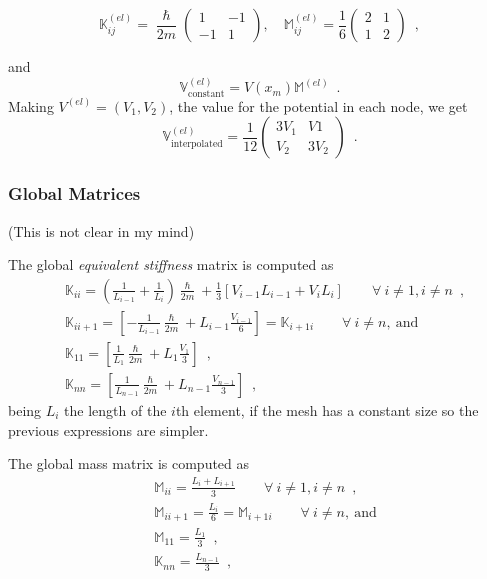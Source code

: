 \documentclass[12pt,letterpaper,final]{article}
\begin{document}
\[\mathbb{K}_{ij}^{(el)} = \frac{\hslash}{2m}  \begin{pmatrix}
  1 & -1  \\
  -1 & 1 
 \end{pmatrix}, \quad \mathbb{M}_{ij}^{(el)} = \frac{1}{6}  \begin{pmatrix}
  2 & 1 \\
  1 & 2 \end{pmatrix} \enspace ,\]
 
and 
 \[\mathbb{V}_{\text{constant}}^{(el)} = V(x_m)\mathbb{M}^{(el)} \enspace .\]
Making ${V}^{(el)} = (V_1,V_2)$, the value for the potential in each node, we get
\[\mathbb{V}_{\text{interpolated}}^{(el)} = \frac{1}{12}  \begin{pmatrix}
  3V_1 & V1 \\
  V_2 & 3V_2 
 \end{pmatrix} \enspace .\]

\subsubsection{Global Matrices}

(This is not clear in my mind)

The global \emph{equivalent stiffness} matrix is computed as
\begin{align*}
&\mathbb{K}_{ii}=\left(\frac{1}{L_{i-1}} + \frac{1}{L_{i}}\right)\frac{\hslash}{2m} + \frac{1}{3}[V_{i-1} L_{i-1} + V_{i}L_{i}] \qquad \forall\ i\neq 1, i\neq n \enspace, \\
&\mathbb{K}_{i i+1}=\left[ -\frac{1}{L_{i-1}}\frac{\hslash}{2m} + L_{i-1}\frac{V_{i-1}}{6} \right]=
\mathbb{K}_{i+1 i} \qquad \forall\ i\neq n ,\ \text{and}\\
&\mathbb{K}_{11}=\left[ \frac{1}{L_{1}}\frac{\hslash}{2m} + L_{1}\frac{V_{1}}{3} \right] \enspace ,\\
&\mathbb{K}_{nn}=\left[ \frac{1}{L_{n-1}}\frac{\hslash}{2m} + L_{n-1}\frac{V_{n-1}}{3} \right] \enspace ,
\end{align*}
being $L_i$ the length of the $i$th element, if the mesh has a constant size so the previous expressions are simpler.

The global mass matrix is computed as
\begin{align*}
&\mathbb{M}_{ii}=\frac{L_i+L_{i+1}}{3} \qquad \forall\ i\neq 1, i\neq n \enspace, \\
&\mathbb{M}_{i i+1}=\frac{L_i}{6}=\mathbb{M}_{i+1 i} \qquad \forall\ i\neq n ,\ \text{and}\\
&\mathbb{M}_{11}=\frac{L_1}{3} \enspace ,\\
&\mathbb{K}_{nn}=\frac{L_{n-1}}{3} \enspace ,
\end{align*}
\end{document}
